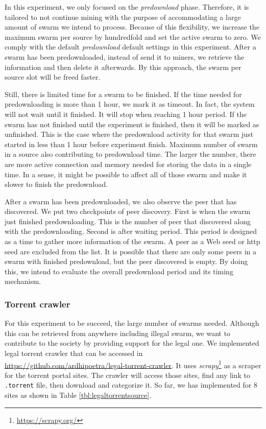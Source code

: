 In this experiment, we only focused on the \textit{predownload} phase. Therefore, it is tailored to not continue mining with the purpose of accommodating a large amount of swarm we intend to process. Because of this flexibility, we increase the maximum swarm per source by hundredfold and set the active swarm to zero. We comply with the default \textit{predownload} default settings in this experiment. After a swarm has been predownloaded, instead of send it to miners, we retrieve the information and then delete it afterwards. By this approach, the swarm per source slot will be freed faster. 

Still, there is limited time for a swarm to be finished. If the time needed for predownloading is more than 1 hour, we mark it as timeout. In fact, the system will not wait until it finished. It will stop when reaching 1 hour period. If the swarm has not finished until the experiment is finished, then it will be marked as unfinished. This is the case where the predownload activity for that swarm just started in less than 1 hour before experiment finish. Maximum number of swarm in a source also contributing to predownload time. The larger the number, there are more active connection and memory needed for storing the data in a single time. In a sense, it might be possible to affect all of those swarm and make it slower to finish the predownload.


After a swarm has been predownloaded, we also observe the peer that has discovered. We put two checkpoints of peer discovery. First is when the swarm just finished predownloading. This is the number of peer that discovered along with the predownloading. Second is after waiting period. This period is designed as a time to gather more information of the swarm. A peer as a Web seed or http seed are excluded from the list. It is possible that there are only some peers in a swarm with finished predownload, but the peer discovered is empty. By doing this, we intend to evaluate the overall predownload period and its timing mechanism. 

\subsubsection{Torrent crawler}
For this experiment to be succeed, the large number of swarms needed. Although this can be retrieved from anywhere including illegal swarm, we want to contribute to the society by providing support for the legal one. We implemented legal torrent crawler that can be accessed in \url{https://github.com/ardhipoetra/legal-torrent-crawler}. It uses \textit{scrapy}\footnote{\url{https://scrapy.org/}} as a scraper for the torrent portal sites. The crawler will access those sites, find any link to \texttt{.torrent} file, then download and categorize it. So far, we has implemented for 8 sites as shown in Table \ref{tbl:legaltorrentsource}.

